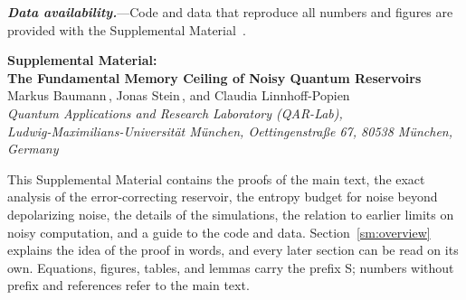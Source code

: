 \documentclass[aps,prl,twocolumn,superscriptaddress,floatfix]{revtex4-2}
\theoremstyle{plain}
\newcommand{\runin}[1]{\textit{\textbf{#1}}---}
\begin{document}
\runin{Data availability.}Code and data that reproduce all numbers and figures are provided with the Supplemental Material~\cite{SM}.

\nocite{Xiong2025,Dao2026}


\clearpage
\onecolumngrid
\setcounter{equation}{0}
\setcounter{figure}{0}
\setcounter{table}{0}
\setcounter{section}{0}
\setcounter{lemma}{0}
\setcounter{page}{1}
\renewcommand{\theequation}{S\arabic{equation}}
\renewcommand{\theHequation}{S\arabic{equation}}
\renewcommand{\thefigure}{S\arabic{figure}}
\renewcommand{\thetable}{S\arabic{table}}
\renewcommand{\thelemma}{S\arabic{lemma}}
\renewcommand{\thepage}{S\arabic{page}}
\renewcommand{\theHfigure}{S\arabic{figure}}
\renewcommand{\theHtable}{S\arabic{table}}
\setcounter{secnumdepth}{3}

\begin{center}
{\large\bfseries Supplemental Material:\\[3pt] The Fundamental Memory Ceiling of Noisy Quantum Reservoirs}\\[10pt]
Markus Baumann\,, Jonas Stein\,, and Claudia Linnhoff-Popien\,\\[3pt]
{\small\itshape Quantum Applications and Research Laboratory (QAR-Lab),\\
Ludwig-Maximilians-Universit\"at M\"unchen, Oettingenstra\ss e 67, 80538 M\"unchen, Germany}
\end{center}

This Supplemental Material contains the proofs of the main text, the exact analysis of the error-correcting reservoir, the entropy budget for noise beyond depolarizing noise, the details of the simulations, the relation to earlier limits on noisy computation, and a guide to the code and data. Section~\ref{sm:overview} explains the idea of the proof in words, and every later section can be read on its own. Equations, figures, tables, and lemmas carry the prefix S; numbers without prefix and references refer to the main text.

\let\addcontentsline\SMaddcontentsline
\tableofcontents
\vspace{8pt}
\end{document}
